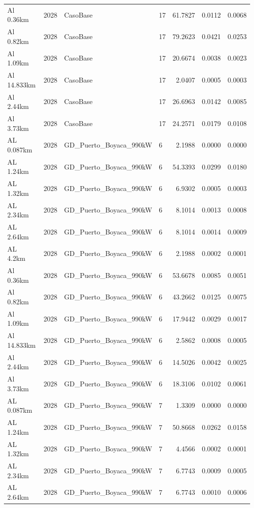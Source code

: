 \documentclass[11pt,a4paper]{article}
\begin{document}
\begin{longtable}{llllrrr}
Al 0.36km & 2028 & CasoBase & 17 & 61.7827 & 0.0112 & 0.0068 \\
Al 0.82km & 2028 & CasoBase & 17 & 79.2623 & 0.0421 & 0.0253 \\
Al 1.09km & 2028 & CasoBase & 17 & 20.6674 & 0.0038 & 0.0023 \\
Al 14.833km & 2028 & CasoBase & 17 & 2.0407 & 0.0005 & 0.0003 \\
Al 2.44km & 2028 & CasoBase & 17 & 26.6963 & 0.0142 & 0.0085 \\
Al 3.73km & 2028 & CasoBase & 17 & 24.2571 & 0.0179 & 0.0108 \\
AL 0.087km & 2028 & GD\_Puerto\_Boyaca\_990kW & 6 & 2.1988 & 0.0000 & 0.0000 \\
AL 1.24km & 2028 & GD\_Puerto\_Boyaca\_990kW & 6 & 54.3393 & 0.0299 & 0.0180 \\
AL 1.32km & 2028 & GD\_Puerto\_Boyaca\_990kW & 6 & 6.9302 & 0.0005 & 0.0003 \\
AL 2.34km & 2028 & GD\_Puerto\_Boyaca\_990kW & 6 & 8.1014 & 0.0013 & 0.0008 \\
AL 2.64km & 2028 & GD\_Puerto\_Boyaca\_990kW & 6 & 8.1014 & 0.0014 & 0.0009 \\
AL 4.2km & 2028 & GD\_Puerto\_Boyaca\_990kW & 6 & 2.1988 & 0.0002 & 0.0001 \\
Al 0.36km & 2028 & GD\_Puerto\_Boyaca\_990kW & 6 & 53.6678 & 0.0085 & 0.0051 \\
Al 0.82km & 2028 & GD\_Puerto\_Boyaca\_990kW & 6 & 43.2662 & 0.0125 & 0.0075 \\
Al 1.09km & 2028 & GD\_Puerto\_Boyaca\_990kW & 6 & 17.9442 & 0.0029 & 0.0017 \\
Al 14.833km & 2028 & GD\_Puerto\_Boyaca\_990kW & 6 & 2.5862 & 0.0008 & 0.0005 \\
Al 2.44km & 2028 & GD\_Puerto\_Boyaca\_990kW & 6 & 14.5026 & 0.0042 & 0.0025 \\
Al 3.73km & 2028 & GD\_Puerto\_Boyaca\_990kW & 6 & 18.3106 & 0.0102 & 0.0061 \\
AL 0.087km & 2028 & GD\_Puerto\_Boyaca\_990kW & 7 & 1.3309 & 0.0000 & 0.0000 \\
AL 1.24km & 2028 & GD\_Puerto\_Boyaca\_990kW & 7 & 50.8668 & 0.0262 & 0.0158 \\
AL 1.32km & 2028 & GD\_Puerto\_Boyaca\_990kW & 7 & 4.4566 & 0.0002 & 0.0001 \\
AL 2.34km & 2028 & GD\_Puerto\_Boyaca\_990kW & 7 & 6.7743 & 0.0009 & 0.0005 \\
AL 2.64km & 2028 & GD\_Puerto\_Boyaca\_990kW & 7 & 6.7743 & 0.0010 & 0.0006 \\

\end{longtable}
\end{document}
